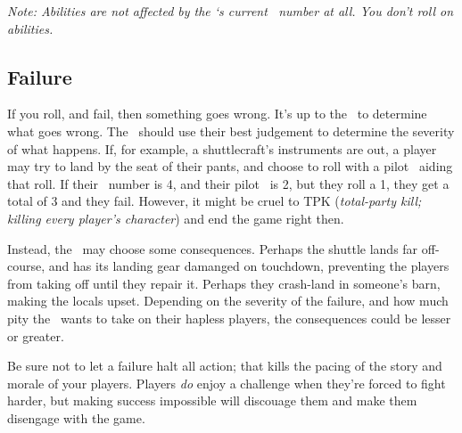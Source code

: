 \par\textit{Note: Abilities are not affected by the \pc `s current \both\, number at all. You don't roll on abilities.}


\subsection{Failure}
If you roll, and fail, then something goes wrong. It's up to the \gm\, to determine what goes wrong. The \gm\, should use their best judgement to determine the severity of what happens. If, for example, a shuttlecraft's instruments are out, a player may try to land by the seat of their pants, and choose to roll with a pilot \skill\, aiding that roll. If their \both\, number is 4, and their pilot \skill\, is 2, but they roll a 1, they get a total of 3 and they fail. However, it might be cruel to TPK (\textit{total-party kill; killing every player's character}) and end the game right then.

\par
Instead, the \gm\, may choose some consequences. Perhaps the shuttle lands far off-course, and has its landing gear damanged on touchdown, preventing the players from taking off until they repair it. Perhaps they crash-land in someone's barn, making the locals upset. Depending on the severity of the failure, and how much pity the \gm\, wants to take on their hapless players, the consequences could be lesser or greater.

\par
Be sure not to let a failure halt all action; that kills the pacing of the story and morale of your players. Players \textit{do} enjoy a challenge when they're forced to fight harder, but making success impossible will discouage them and make them disengage with the game.